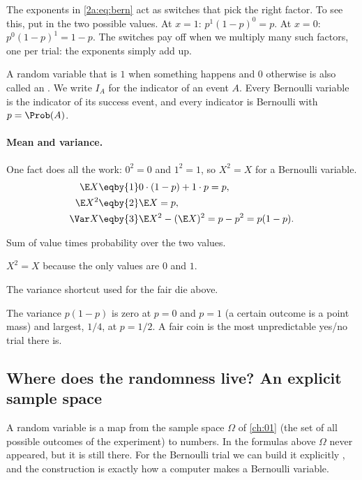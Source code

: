 The exponents in \eqref{2a:eq:bern} act as switches that pick the right factor. To see this, put in the two possible values. At $x=1$: $p^1(1-p)^0=p$. At $x=0$: $p^0(1-p)^1=1-p$. The switches pay off when we multiply many such factors, one per trial: the exponents simply add up.

A random variable that is $1$ when something happens and $0$ otherwise is also called an . We write $I_A$ for the indicator of an event $A$. Every Bernoulli variable is the indicator of its success event, and every indicator is Bernoulli with $p=\Prob(A)$.

\paragraph{Mean and variance.} One fact does all the work: $0^2=0$ and $1^2=1$, so $X^2=X$ for a Bernoulli variable.
\begin{align}
  \E X &\eqby{1} 0\cdot(1-p)+1\cdot p = p, \nonumber\\
  \E X^2 &\eqby{2} \E X = p, \nonumber\\
  \Var X &\eqby{3} \E X^2-(\E X)^2 = p-p^2 = p(1-p). \label{2a:eq:bernvar}
\end{align}
\begin{explain}
  \item Sum of value times probability over the two values.
  \item $X^2=X$ because the only values are $0$ and $1$.
  \item The variance shortcut used for the fair die above.
\end{explain}
The variance $p(1-p)$ is zero at $p=0$ and $p=1$ (a certain outcome is a point mass) and largest, $1/4$, at $p=1/2$. A fair coin is the most unpredictable yes/no trial there is.

\subsection{Where does the randomness live? An explicit sample space}

A random variable is a map from the sample space $\Omega$ of \cref{ch:01} (the set of all possible outcomes of the experiment) to numbers. In the formulas above $\Omega$ never appeared, but it is still there. For the Bernoulli trial we can build it explicitly , and the construction is exactly how a computer makes a Bernoulli variable.

